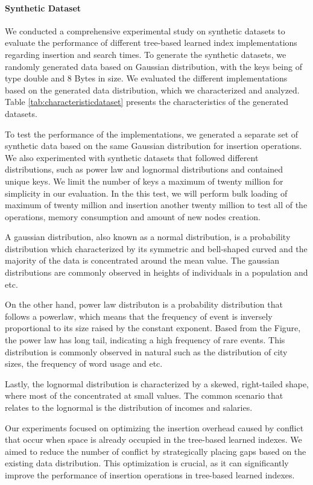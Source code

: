 \documentclass[11pt,a4paper]{article}
\newcommand{\conflict}{\textsf{conflict}\xspace}
\begin{document}
\paragraph{Synthetic Dataset}
We conducted a comprehensive experimental study on synthetic datasets to evaluate the performance of different tree-based learned index implementations regarding insertion and search times. To generate the synthetic datasets, we randomly generated data based on Gaussian distribution, with the keys being of type double and 8 Bytes in size. We evaluated the different implementations based on the generated data distribution, which we characterized and analyzed. Table \ref{tab:characteristicdataset} presents the characteristics of the generated datasets.

To test the performance of the implementations, we generated a separate set of synthetic data based on the same Gaussian distribution for insertion operations. We also experimented with synthetic datasets that followed different distributions, such as power law and lognormal distributions and contained unique keys. We limit the number of keys a maximum of twenty million for simplicity in our evaluation. In the this test, we will perform bulk loading of maximum of twenty million and insertion another twenty million to test all of the operations, memory consumption and amount of new nodes creation.

A gaussian distribution, also known as a normal distribution, is a probability distribution which characterized by its symmetric and bell-shaped curved and the majority of the data is concentrated around the mean value. The gaussian distributions are commonly observed in heights of individuals in a population and etc. 

On the other hand, power law distributon is a probability distribution that follows a powerlaw, which means that the frequency of event is inversely proportional to its size raised by the constant exponent. Based from the Figure, the power law has long tail, indicating a high frequency of rare events. This distribution is commonly observed in natural such as the distribution of city sizes, the frequency of word usage and etc. 

Lastly, the lognormal distribution is characterized by a skewed, right-tailed shape, where most of the concentrated at small values. The common scenario that relates to the lognormal is the distribution of incomes and salaries.

Our experiments focused on optimizing the insertion overhead caused by \conflict that occur when space is already occupied in the tree-based learned indexes. We aimed to reduce the number of \conflict by strategically placing gaps based on the existing data distribution. This optimization is crucial, as it can significantly improve the performance of insertion operations in tree-based learned indexes.
\end{document}
